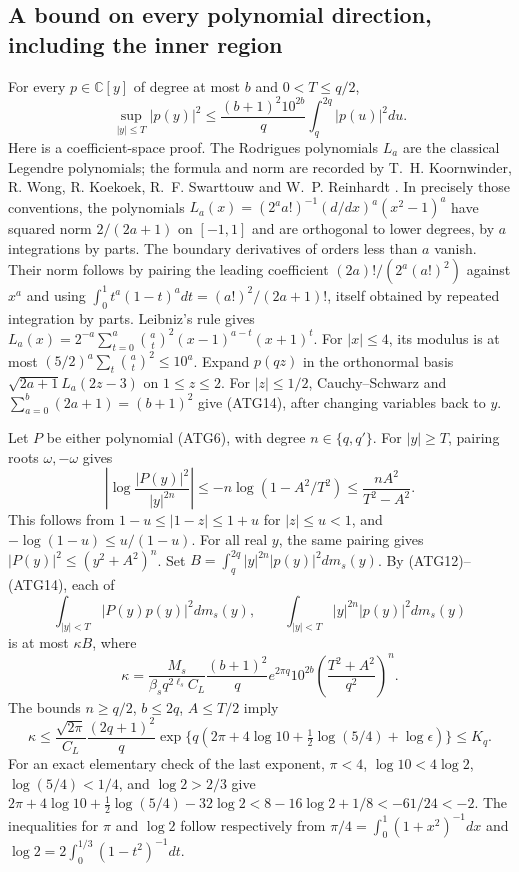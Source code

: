 \subsection{A bound on every polynomial direction, including the inner region}

For every $p\in\mathbb C[y]$ of degree at most $b$ and
$0<T\le q/2$,
\[
 \sup_{|y|\le T}|p(y)|^2
 \le\frac{(b+1)^2 10^{2b}}q\int_q^{2q}|p(u)|^2du.
\tag{ATG14}
\]
Here is a coefficient-space proof. The Rodrigues polynomials
$L_a$ are the classical Legendre polynomials; the formula and norm
are recorded by T.~H. Koornwinder, R. Wong, R. Koekoek,
R.~F. Swarttouw and W.~P. Reinhardt
\cite[eq.~(18.5.5), Table~18.5.1, and the Legendre and
shifted-Legendre rows of Table~18.3.1]{human:dlmf18}.
In precisely those conventions, the polynomials
$L_a(x)=(2^aa!)^{-1}(d/dx)^a(x^2-1)^a$ have squared norm
$2/(2a+1)$ on $[-1,1]$ and are orthogonal to lower degrees,
by $a$ integrations by parts. The boundary derivatives of orders
less than $a$ vanish. Their norm follows by pairing the leading
coefficient $(2a)!/(2^a(a!)^2)$ against $x^a$ and using
$\int_0^1 t^a(1-t)^a dt=(a!)^2/(2a+1)!$, itself obtained by
repeated integration by parts. Leibniz's rule gives
$L_a(x)=2^{-a}\sum_{t=0}^a\binom at^2(x-1)^{a-t}(x+1)^t$.
For $|x|\le4$, its modulus is at most
$(5/2)^a\sum_t\binom at^2\le10^a$.
Expand $p(qz)$ in the orthonormal basis
$\sqrt{2a+1}L_a(2z-3)$ on $1\le z\le2$.
For $|z|\le1/2$, Cauchy--Schwarz and
$\sum_{a=0}^b(2a+1)=(b+1)^2$ give (ATG14), after changing
variables back to $y$.

Let $P$ be either polynomial (ATG6), with degree $n\in\{q,q'\}$.
For $|y|\ge T$, pairing roots $\omega,-\omega$ gives
\[
 \left|\log\frac{|P(y)|^2}{|y|^{2n}}\right|
 \le-n\log(1-A^2/T^2)\le\frac{nA^2}{T^2-A^2}.
\tag{ATG15}
\]
This follows from $1-u\le|1-z|\le1+u$ for $|z|\le u<1$,
and $-\log(1-u)\le u/(1-u)$.
For all real $y$, the same pairing gives
$|P(y)|^2\le(y^2+A^2)^n$.
Set $B=\int_q^{2q}|y|^{2n}|p(y)|^2dm_s(y)$.
By (ATG12)--(ATG14), each of
\[
 \int_{|y|<T}|P(y)p(y)|^2dm_s(y),\qquad
 \int_{|y|<T}|y|^{2n}|p(y)|^2dm_s(y)
\]
is at most $\kappa B$, where
\[
 \kappa=\frac{M_s}{\beta_s q^{2\ell_s}C_L}
  \frac{(b+1)^2}{q}e^{2\pi q}10^{2b}
             \left(\frac{T^2+A^2}{q^2}\right)^n.
\tag{ATG16}
\]
The bounds $n\ge q/2$, $b\le2q$, $A\le T/2$ imply
\[
 \kappa\le\frac{\sqrt{2\pi}}{C_L}\frac{(2q+1)^2}{q}
 \exp\{q(2\pi+4\log10+\tfrac12\log(5/4)+\log\epsilon)\}
 \le K_q.
\tag{ATG17}
\]
For an exact elementary check of the last exponent,
$\pi<4$, $\log10<4\log2$, $\log(5/4)<1/4$, and
$\log2>2/3$ give
$2\pi+4\log10+\tfrac12\log(5/4)-32\log2
 <8-16\log2+1/8<-61/24<-2$.
The inequalities for $\pi$ and $\log2$ follow respectively from
$\pi/4=\int_0^1(1+x^2)^{-1}dx$ and
$\log2=2\int_0^{1/3}(1-t^2)^{-1}dt$.

